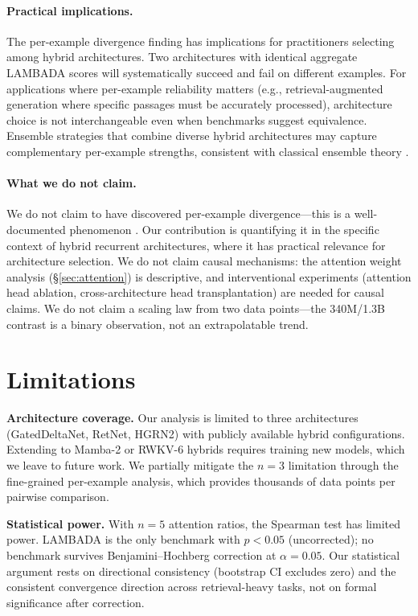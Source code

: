 \documentclass[11pt,twocolumn]{article}
\begin{document}
\paragraph{Practical implications.}
The per-example divergence finding has implications for practitioners selecting among hybrid architectures.
Two architectures with identical aggregate LAMBADA scores will systematically succeed and fail on different examples.
For applications where per-example reliability matters (e.g., retrieval-augmented generation where specific passages must be accurately processed), architecture choice is not interchangeable even when benchmarks suggest equivalence.
Ensemble strategies that combine diverse hybrid architectures may capture complementary per-example strengths, consistent with classical ensemble theory \citep{krogh1994neural}.

\paragraph{What we do not claim.}
We do not claim to have discovered per-example divergence---this is a well-documented phenomenon \citep{damour2022underspecification,fort2019deep,mccoy2020berts}.
Our contribution is quantifying it in the specific context of hybrid recurrent architectures, where it has practical relevance for architecture selection.
We do not claim causal mechanisms: the attention weight analysis (\S\ref{sec:attention}) is descriptive, and interventional experiments (attention head ablation, cross-architecture head transplantation) are needed for causal claims.
We do not claim a scaling law from two data points---the 340M/1.3B contrast is a binary observation, not an extrapolatable trend.


\section{Limitations}

\textbf{Architecture coverage.}
Our analysis is limited to three architectures (GatedDeltaNet, RetNet, HGRN2) with publicly available hybrid configurations.
Extending to Mamba-2 or RWKV-6 hybrids requires training new models, which we leave to future work.
We partially mitigate the $n{=}3$ limitation through the fine-grained per-example analysis, which provides thousands of data points per pairwise comparison.

\textbf{Statistical power.}
With $n{=}5$ attention ratios, the Spearman test has limited power.
LAMBADA is the only benchmark with $p{<}0.05$ (uncorrected); no benchmark survives Benjamini--Hochberg correction at $\alpha{=}0.05$.
Our statistical argument rests on directional consistency (bootstrap CI excludes zero) and the consistent convergence direction across retrieval-heavy tasks, not on formal significance after correction.
\end{document}
